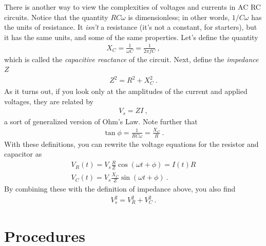 \documentclass[12pt]{article}
\begin{document}
There is another way to view the complexities of voltages and currents
in AC RC circuits.  Notice that the quantity $RC\omega$ is
dimensionless; in other words, $1/C\omega$ has the units of
resistance.  It \textit{isn't} a resistance (it's not a constant, for
starters), but it has the same units, and some of the same properties.
Let's define the quantity
\begin{gather*}
  X_C = \frac{1}{\omega C} = \frac{1}{2\pi f C}\ ,
\end{gather*}
which is called the \textit{capacitive reactance} of the circuit.
Next, define the \textit{impedance} $Z$
\begin{gather*}
  Z^2 = R^2 + X_C^2\ .
\end{gather*}
As it turns out, if you look only at the amplitudes of the current and
applied voltages, they are related by
\begin{gather*}
  V_s = Z I\ ,
\end{gather*}
a sort of generalized version of Ohm's Law.  Note further that
\begin{gather*}
  \tan \phi = \frac{1}{RC\omega} = \frac{X_C}{R}\ .
\end{gather*}
With these definitions, you can rewrite the voltage equations for the
resistor and capacitor as
\begin{gather*}
  V_R(t) = V_s \frac{R}{Z} \cos( \omega t + \phi) = I(t) R\\
  V_C(t) = V_s \frac{X_C}{Z} \sin( \omega t + \phi)\ .
\end{gather*}
By combining these with the definition of impedance above, you also
find
\begin{gather*}
  V_s^2 = V_R^2 + V_C^2\ .
\end{gather*}

\section{Procedures}
\label{sec:procedures}
\end{document}
